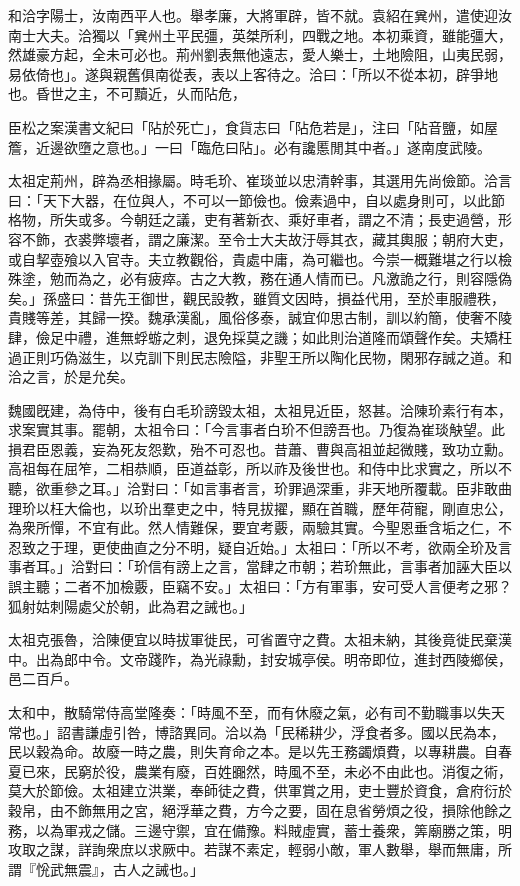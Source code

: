 
\begin{pinyinscope}
和洽字陽士，汝南西平人也。舉孝廉，大將軍辟，皆不就。袁紹在兾州，遣使迎汝南士大夫。洽獨以「兾州土平民彊，英桀所利，四戰之地。本初乘資，雖能彊大，然雄豪方起，全未可必也。荊州劉表無他遠志，愛人樂士，土地險阻，山夷民弱，易依倚也」。遂與親舊俱南從表，表以上客待之。洽曰：「所以不從本初，辟爭地也。昏世之主，不可黷近，乆而阽危，

臣松之案漢書文紀曰「阽於死亡」，食貨志曰「阽危若是」，注曰「阽音鹽，如屋簷，近邊欲墮之意也。」一曰「臨危曰阽」。必有讒慝閒其中者。」遂南度武陵。

太祖定荊州，辟為丞相掾屬。時毛玠、崔琰並以忠清幹事，其選用先尚儉節。洽言曰：「天下大器，在位與人，不可以一節儉也。儉素過中，自以處身則可，以此節格物，所失或多。今朝廷之議，吏有著新衣、乘好車者，謂之不清；長吏過營，形容不飾，衣裘弊壞者，謂之廉潔。至令士大夫故汙辱其衣，藏其輿服；朝府大吏，或自挈壺飱以入官寺。夫立教觀俗，貴處中庸，為可繼也。今崇一概難堪之行以檢殊塗，勉而為之，必有疲瘁。古之大教，務在通人情而已。凡激詭之行，則容隱偽矣。」孫盛曰：昔先王御世，觀民設教，雖質文因時，損益代用，至於車服禮秩，貴賤等差，其歸一揆。魏承漢亂，風俗侈泰，誠宜仰思古制，訓以約簡，使奢不陵肆，儉足中禮，進無蜉蝣之刺，退免採莫之譏；如此則治道隆而頌聲作矣。夫矯枉過正則巧偽滋生，以克訓下則民志險隘，非聖王所以陶化民物，閑邪存誠之道。和洽之言，於是允矣。

魏國旣建，為侍中，後有白毛玠謗毀太祖，太祖見近臣，怒甚。洽陳玠素行有本，求案實其事。罷朝，太祖令曰：「今言事者白玠不但謗吾也。乃復為崔琰觖望。此損君臣恩義，妄為死友怨歎，殆不可忍也。昔蕭、曹與高祖並起微賤，致功立勳。高祖每在屈笮，二相恭順，臣道益彰，所以祚及後世也。和侍中比求實之，所以不聽，欲重參之耳。」洽對曰：「如言事者言，玠罪過深重，非天地所覆載。臣非敢曲理玠以枉大倫也，以玠出羣吏之中，特見拔擢，顯在首職，歷年荷寵，剛直忠公，為衆所憚，不宜有此。然人情難保，要宜考覈，兩驗其實。今聖恩垂含垢之仁，不忍致之于理，更使曲直之分不明，疑自近始。」太祖曰：「所以不考，欲兩全玠及言事者耳。」洽對曰：「玠信有謗上之言，當肆之巿朝；若玠無此，言事者加誣大臣以誤主聽；二者不加檢覈，臣竊不安。」太祖曰：「方有軍事，安可受人言便考之邪？狐射姑刺陽處父於朝，此為君之誡也。」

太祖克張魯，洽陳便宜以時拔軍徙民，可省置守之費。太祖未納，其後竟徙民棄漢中。出為郎中令。文帝踐阼，為光祿勳，封安城亭侯。明帝即位，進封西陵鄉侯，邑二百戶。

太和中，散騎常侍高堂隆奏：「時風不至，而有休廢之氣，必有司不勤職事以失天常也。」詔書謙虛引咎，博諮異同。洽以為「民稀耕少，浮食者多。國以民為本，民以穀為命。故廢一時之農，則失育命之本。是以先王務蠲煩費，以專耕農。自春夏已來，民窮於役，農業有廢，百姓嚻然，時風不至，未必不由此也。消復之術，莫大於節儉。太祖建立洪業，奉師徒之費，供軍賞之用，吏士豐於資食，倉府衍於穀帛，由不飾無用之宮，絕浮華之費，方今之要，固在息省勞煩之役，損除他餘之務，以為軍戎之儲。三邊守禦，宜在備豫。料賊虛實，蓄士養衆，筭廟勝之策，明攻取之謀，詳詢衆庶以求厥中。若謀不素定，輕弱小敵，軍人數舉，舉而無庸，所謂『恱武無震』，古人之誡也。」


\end{pinyinscope}
